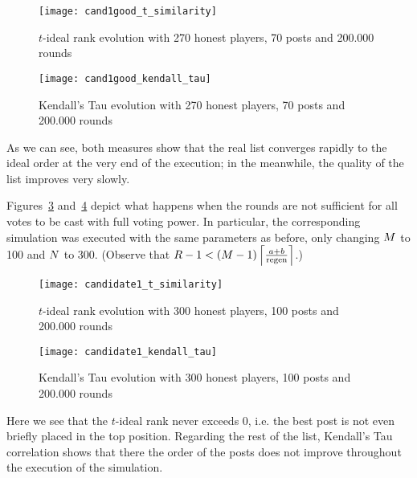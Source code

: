       \begin{figure}[!htbp]
        \texttt{[image: cand1good\_t\_similarity]}
        \caption{$t$-ideal rank evolution with 270 honest players, 70 posts and
        200.000 rounds}
        \label{fig:honest:70:tideal}
      \end{figure}

      \begin{figure}[!htbp]
        \texttt{[image: cand1good\_kendall\_tau]}
        \caption{Kendall's Tau evolution with 270 honest players, 70 posts and
        200.000 rounds}
        \label{fig:honest:70:coeffs}
      \end{figure}

      As we can see, both measures show that the real list converges rapidly to
      the ideal order at the very end of the execution; in the meanwhile, the
      quality of the list improves very slowly.

      Figures~\ref{fig:honest:100:tideal} and~\ref{fig:honest:100:coeffs} depict
      what happens when the rounds are not sufficient for all votes to be cast
      with full voting power. In particular, the corresponding simulation was
      executed with the same parameters as before, only changing $\postlen$ to
      100 and $\playerlen$ to 300. (Observe that $\rounds - 1 < \left(\postlen -
      1\right)\ceil*{\frac{a + b}{\regen}}$.)

      \begin{figure}[!htbp]
        \texttt{[image: candidate1\_t\_similarity]}
        \caption{$t$-ideal rank evolution with 300 honest players, 100 posts and
        200.000 rounds}
        \label{fig:honest:100:tideal}
      \end{figure}

      \begin{figure}[!htbp]
        \texttt{[image: candidate1\_kendall\_tau]}
        \caption{Kendall's Tau evolution with 300 honest players, 100 posts and
        200.000 rounds}
        \label{fig:honest:100:coeffs}
      \end{figure}

      Here we see that the $t$-ideal rank never exceeds 0, i.e. the best post is
      not even briefly placed in the top position. Regarding the rest of the
      list, Kendall's Tau correlation shows that there the order of the posts
      does not improve throughout the execution of the simulation.

